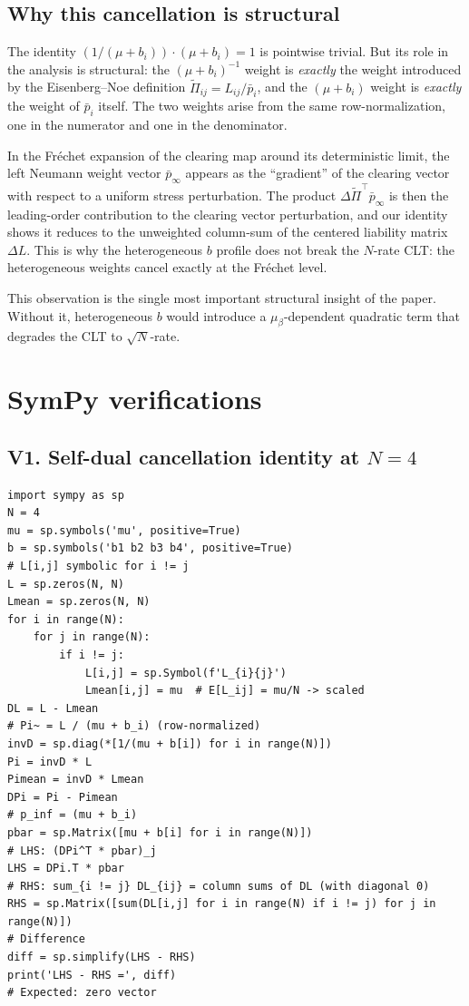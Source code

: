 \documentclass[11pt,a4paper]{article}
\theoremstyle{definition}
\newcommand{\DPi}{\Delta\widetilde{\Pi}}
\newcommand{\pbarinf}{{\bar p}_{\infty}}
\begin{document}
\subsection*{Why this cancellation is structural}

The identity $(1/(\mu+b_i))\cdot(\mu+b_i) = 1$ is pointwise trivial. But
its role in the analysis is structural: the $(\mu+b_i)^{-1}$ weight is
\emph{exactly} the weight introduced by the Eisenberg--Noe definition
$\widetilde\Pi_{ij} = L_{ij}/\bar p_i$, and the $(\mu+b_i)$ weight is
\emph{exactly} the weight of $\bar p_i$ itself. The two weights arise from
the same row-normalization, one in the numerator and one in the denominator.

In the Fr\'echet expansion of the clearing map around its deterministic
limit, the left Neumann weight vector $\pbarinf$ appears as the
``gradient'' of the clearing vector with respect to a uniform stress
perturbation. The product $\DPi^\top\pbarinf$ is then the leading-order
contribution to the clearing vector perturbation, and our identity shows
it reduces to the unweighted column-sum of the centered liability matrix
$\Delta L$. This is why the heterogeneous $b$ profile does not break the
$N$-rate CLT: the heterogeneous weights cancel exactly at the Fr\'echet
level.

This observation is the single most important structural insight of the
paper. Without it, heterogeneous $b$ would introduce a $\mu_\beta$-dependent
quadratic term that degrades the CLT to $\sqrt N$-rate.

\section{SymPy verifications}
\label{app:sympy}

\subsection*{V1. Self-dual cancellation identity at $N=4$}

\begin{verbatim}
import sympy as sp
N = 4
mu = sp.symbols('mu', positive=True)
b = sp.symbols('b1 b2 b3 b4', positive=True)
# L[i,j] symbolic for i != j
L = sp.zeros(N, N)
Lmean = sp.zeros(N, N)
for i in range(N):
    for j in range(N):
        if i != j:
            L[i,j] = sp.Symbol(f'L_{i}{j}')
            Lmean[i,j] = mu  # E[L_ij] = mu/N -> scaled
DL = L - Lmean
# Pi~ = L / (mu + b_i) (row-normalized)
invD = sp.diag(*[1/(mu + b[i]) for i in range(N)])
Pi = invD * L
Pimean = invD * Lmean
DPi = Pi - Pimean
# p_inf = (mu + b_i)
pbar = sp.Matrix([mu + b[i] for i in range(N)])
# LHS: (DPi^T * pbar)_j
LHS = DPi.T * pbar
# RHS: sum_{i != j} DL_{ij} = column sums of DL (with diagonal 0)
RHS = sp.Matrix([sum(DL[i,j] for i in range(N) if i != j) for j in range(N)])
# Difference
diff = sp.simplify(LHS - RHS)
print('LHS - RHS =', diff)
# Expected: zero vector
\end{verbatim}
\end{document}
